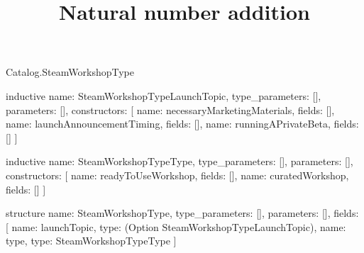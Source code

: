 \begin{lexlean}{Catalog.SteamWorkshopType}
\title{Natural number addition}
\begin{semanticmodule}
inductive{
  name: SteamWorkshopTypeLaunchTopic,
  type_parameters: [],
  parameters: [],
  constructors: [
    {name: necessaryMarketingMaterials, fields: []},
    {name: launchAnnouncementTiming, fields: []},
    {name: runningAPrivateBeta, fields: []}
  ]
}

inductive{
  name: SteamWorkshopTypeType,
  type_parameters: [],
  parameters: [],
  constructors: [
    {name: readyToUseWorkshop, fields: []},
    {name: curatedWorkshop, fields: []}
  ]
}

structure{
  name: SteamWorkshopType,
  type_parameters: [],
  parameters: [],
  fields: [
    {name: launchTopic, type: (Option SteamWorkshopTypeLaunchTopic)},
    {name: type, type: SteamWorkshopTypeType}
  ]
}
\end{semanticmodule}
\end{lexlean}
